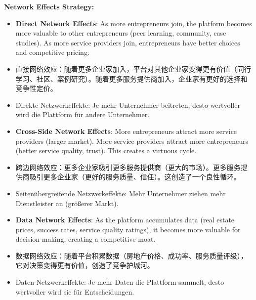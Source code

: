 \textbf{Network Effects Strategy:}
\begin{itemize}
    \item \textbf{Direct Network Effects}: As more entrepreneurs join, the platform becomes more valuable to other entrepreneurs (peer learning, community, case studies). As more service providers join, entrepreneurs have better choices and competitive pricing.
    \item 直接网络效应：随着更多企业家加入，平台对其他企业家变得更有价值（同行学习、社区、案例研究）。随着更多服务提供商加入，企业家有更好的选择和竞争性定价。
    \item Direkte Netzwerkeffekte: Je mehr Unternehmer beitreten, desto wertvoller wird die Plattform für andere Unternehmer.
    
    \item \textbf{Cross-Side Network Effects}: More entrepreneurs attract more service providers (larger market). More service providers attract more entrepreneurs (better service quality, trust). This creates a virtuous cycle.
    \item 跨边网络效应：更多企业家吸引更多服务提供商（更大的市场）。更多服务提供商吸引更多企业家（更好的服务质量、信任）。这创造了一个良性循环。
    \item Seitenübergreifende Netzwerkeffekte: Mehr Unternehmer ziehen mehr Dienstleister an (größerer Markt).
    
    \item \textbf{Data Network Effects}: As the platform accumulates data (real estate prices, success rates, service quality ratings), it becomes more valuable for decision-making, creating a competitive moat.
    \item 数据网络效应：随着平台积累数据（房地产价格、成功率、服务质量评级），它对决策变得更有价值，创造了竞争护城河。
    \item Daten-Netzwerkeffekte: Je mehr Daten die Plattform sammelt, desto wertvoller wird sie für Entscheidungen.
\end{itemize}

